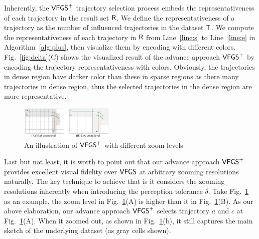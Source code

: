 Inherently, the $\mathsf{VFGS}^{+}$ trajectory selection process embeds the representativeness of each trajectory in the result set $\mathsf{R}$.
We define the representativeness of a trajectory as the number of influenced trajectories in the dataset $\mathsf{T}$.
We compute the representativeness of each trajectory in $\mathsf{R}$ from Line~\ref{line:s} to Line~\ref{line:e} in Algorithm~\ref{alg:plus}, then visualize them by encoding with different colors.
Fig.~\ref{fig:delta}(C) shows the visualized result of the  advance approach $\mathsf{VFGS}^{+}$ by encoding the trajectory representativeness with colors.
Obviously, the trajectories in dense region have {darker} color than these in sparse regions as there many trajectories in dense region, thus the selected trajectories in the dense region are more representative.

\begin{figure}[t]
	\centering
	\includegraphics[width=0.4\textwidth]{pictures/problemsolveing/one_to_many.pdf}
	\vspace{-3mm}
	\caption{An illustration of $\mathsf{VFGS}^{+}$ with different zoom levels}
	\label{fig:zoom}
    \vspace{-6mm}
\end{figure}

Last but not least, it is worth to point out that our advance approach $\mathsf{VFGS}^{+}$ provides excellent visual fidelity over $\mathsf{VFGS}$ at arbitrary zooming resolutions naturally.
The key technique to achieve that is it considers the zooming resolutions inherently when introducing the perception tolerance $\delta$.
Take Fig.~\ref{fig:zoom} as an example, %
the zoom level in Fig.~\ref{fig:zoom}(A) is higher than it in Fig.~\ref{fig:zoom}(B).
As our above elaboration, our advance approach $\mathsf{VFGS}^{+}$ selects trajectory $a$ and $c$ at Fig.~\ref{fig:zoom}(A).
When it zoomed out, as shown in Fig.~\ref{fig:zoom}(b), it still captures the main sketch of the underlying dataset (as gray cells shown).







